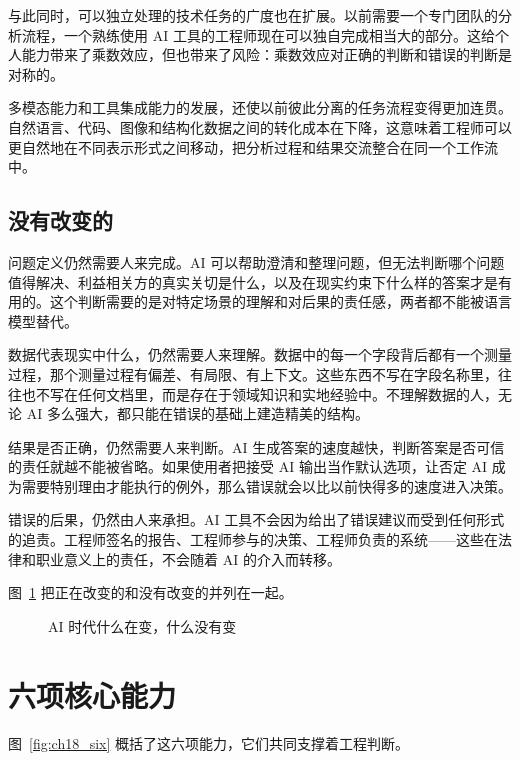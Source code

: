 与此同时，可以独立处理的技术任务的广度也在扩展。以前需要一个专门团队的分析流程，一个熟练使用 AI 工具的工程师现在可以独自完成相当大的部分。这给个人能力带来了乘数效应，但也带来了风险：乘数效应对正确的判断和错误的判断是对称的。

多模态能力和工具集成能力的发展，还使以前彼此分离的任务流程变得更加连贯。自然语言、代码、图像和结构化数据之间的转化成本在下降，这意味着工程师可以更自然地在不同表示形式之间移动，把分析过程和结果交流整合在同一个工作流中。

\subsection{没有改变的}

问题定义仍然需要人来完成。AI 可以帮助澄清和整理问题，但无法判断哪个问题值得解决、利益相关方的真实关切是什么，以及在现实约束下什么样的答案才是有用的。这个判断需要的是对特定场景的理解和对后果的责任感，两者都不能被语言模型替代。

数据代表现实中什么，仍然需要人来理解。数据中的每一个字段背后都有一个测量过程，那个测量过程有偏差、有局限、有上下文。这些东西不写在字段名称里，往往也不写在任何文档里，而是存在于领域知识和实地经验中。不理解数据的人，无论 AI 多么强大，都只能在错误的基础上建造精美的结构。

结果是否正确，仍然需要人来判断。AI 生成答案的速度越快，判断答案是否可信的责任就越不能被省略。如果使用者把接受 AI 输出当作默认选项，让否定 AI 成为需要特别理由才能执行的例外，那么错误就会以比以前快得多的速度进入决策。

错误的后果，仍然由人来承担。AI 工具不会因为给出了错误建议而受到任何形式的追责。工程师签名的报告、工程师参与的决策、工程师负责的系统——这些在法律和职业意义上的责任，不会随着 AI 的介入而转移。

图~\ref{fig:ch18_change} 把正在改变的和没有改变的并列在一起。

\begin{figure}[H]
  \centering
  \caption{AI 时代什么在变，什么没有变}
  \label{fig:ch18_change}
\end{figure}

\section{六项核心能力}

图~\ref{fig:ch18_six} 概括了这六项能力，它们共同支撑着工程判断。

